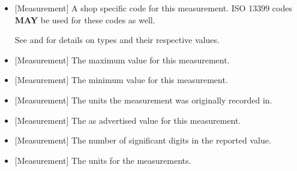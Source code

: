 \begin{itemize}

\item {}[Measurement] \newline A shop specific code for this measurement. ISO 13399 codes \textbf{MAY} be used for these codes as well. 

See  and  for details on  types and their respective  values.

\item {}[Measurement] \newline The maximum value for this measurement. 

\item {}[Measurement] \newline The minimum value for this measurement. 

\item {}[Measurement] \newline The units the measurement was originally recorded in.

\item {}[Measurement] \newline The as advertised value for this measurement.


\item {}[Measurement] \newline The number of significant digits in the reported value. 

\item {}[Measurement] \newline The units for the measurements. 
\end{itemize}


